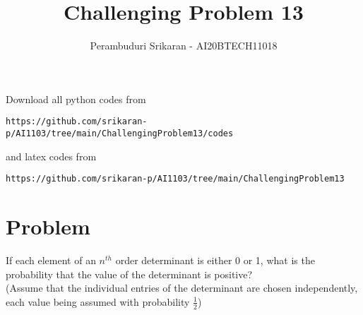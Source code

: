 \documentclass[journal,12pt,twocolumn]{IEEEtran}
\begin{document}
\let\StandardTheFigure\thefigure
\let\vec\mathbf
\renewcommand{\thefigure}{\theproblem}
\def\putbox#1#2#3{\makebox[0in][l]{\makebox[#1][l]{}\raisebox{\baselineskip}[0in][0in]{\raisebox{#2}[0in][0in]{#3}}}}
     \def\rightbox#1{\makebox[0in][r]{#1}}
     \def\centbox#1{\makebox[0in]{#1}}
     \def\topbox#1{\raisebox{-\baselineskip}[0in][0in]{#1}}
     \def\midbox#1{\raisebox{-0.5\baselineskip}[0in][0in]{#1}}
\vspace{3cm}
\title{Challenging Problem 13}
\author{Perambuduri Srikaran - AI20BTECH11018}
\maketitle
\newpage
\bigskip
\renewcommand{\thefigure}{\theenumi}
\renewcommand{\thetable}{\theenumi}
Download all python codes from
\begin{lstlisting}
https://github.com/srikaran-p/AI1103/tree/main/ChallengingProblem13/codes
\end{lstlisting}
and latex codes from 
\begin{lstlisting}
https://github.com/srikaran-p/AI1103/tree/main/ChallengingProblem13
\end{lstlisting}
\section*{Problem}
If each element of an $n^{th}$ order determinant is either 0 or 1, what is the probability that the value of the determinant is positive? \\
(Assume that the individual entries of the determinant are chosen independently, each value being assumed with probability $\frac{1}{2}$)
\end{document}
